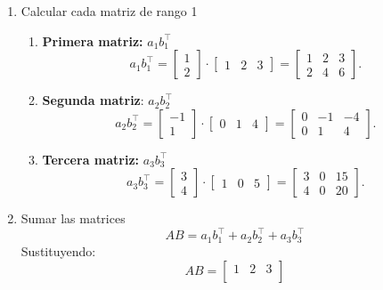 \begin{enumerate}[label=\color{red}\textbf{\arabic*)}]
\begin{enumerate}[label=Paso \arabic*:]
\begin{itemize}[label=\textbullet]
        \end{itemize}
    \item Calcular cada matriz de rango 1
        \begin{enumerate}[label=\arabic*)]
            \item \textbf{Primera matriz:} $a_1b_1^\intercal$ \[
            a_1b_1^\intercal=\begin{bmatrix} 
            1\\
            2
            \end{bmatrix} \cdot \begin{bmatrix} 
            1 & 2 & 3 
            \end{bmatrix} =\begin{bmatrix} 
            1 & 2 & 3\\
            2 & 4 & 6
            \end{bmatrix} .
            \]  
        \item \textbf{Segunda matriz}: $a_2b_2^\intercal$ \[
        a_2b_2^\intercal=\begin{bmatrix} 
        -1\\
        1
        \end{bmatrix} \cdot \begin{bmatrix} 
        0 & 1 & 4 
        \end{bmatrix} =\begin{bmatrix} 
        0 & -1 & -4\\
        0 & 1 & 4
        \end{bmatrix} .
        \]  
    \item \textbf{Tercera matriz:} $a_3b_3^\intercal$
        \[
        a_3b_3^\intercal=\begin{bmatrix} 
        3\\
        4
        \end{bmatrix} \cdot \begin{bmatrix} 
        1 & 0 & 5 
        \end{bmatrix} =\begin{bmatrix} 
        3 & 0 & 15\\
        4 & 0 & 20
        \end{bmatrix} .
        \] 
        \end{enumerate}
    \item Sumar las matrices \[
    AB=a_1b_1^\intercal+a_2b_2^\intercal+a_3b_3^\intercal
    \] 
    Sustituyendo: \[
    AB=\begin{bmatrix} 
        1 & 2 & 3\\

\end{bmatrix}\]
\end{enumerate}
\end{enumerate}
